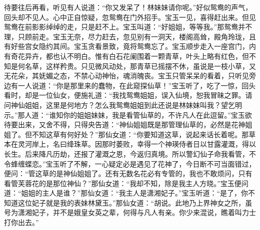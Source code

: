 \begin{parag}
    待要往后再看，听见有人说道：“你又发呆了！林妹妹请你呢。”好似鸳鸯的声气，回头却不见人。心中正自惊疑，忽鸳鸯在门外招手。宝玉一见，喜得赶出来。但见鸳鸯在前影影绰绰的走，只是赶不上。宝玉叫道：“好姐姐，等等我。”那鸳鸯并不理，只顾前走。宝玉无奈，尽力赶去，忽见别有一洞天，楼阁高耸，殿角玲珑，且有好些宫女隐约其间。宝玉贪看景致，竟将鸳鸯忘了。宝玉顺步走入一座宫门，内有奇花异卉，都也认不明白。惟有白石花阑围着一颗青草，叶头上略有红色，但不知是何名草，这样矜贵。只见微风动处，那青草已摇摆不休，虽说是一枝小草，又无花朵，其妩媚之态，不禁心动神怡，魂消魄丧。宝玉只管呆呆的看着，只听见旁边有一人说道：“你是那里来的蠢物，在此窥探仙草！”宝玉听了，吃了一惊，回头看时，却是一位仙女，便施礼道：“我找鸳鸯姐姐，误入仙境，恕我冒昧之罪。请问神仙姐姐，这里是何地方？怎么我鸳鸯姐姐到此还说是林妹妹叫我？望乞明示。”那人道：“谁知你的姐姐妹妹，我是看管仙草的，不许凡人在此逗留。”宝玉欲待要出来，又舍不得，只得央告道：“神仙姐姐既是那管理仙草的，必然是花神姐姐了。但不知这草有何好处？”那仙女道：“你要知道这草，说起来话长着呢。那草本在灵河岸上，名曰绛珠草。因那时萎败，幸得一个神瑛侍者日以甘露灌溉，得以长生。后来降凡历劫，还报了灌溉之恩，今返归真境。所以警幻仙子命我看管，不令蜂缠蝶恋。”宝玉听了不解，一心疑定必是遇见了花神了，今日断不可当面错过，便问：“管这草的是神仙姐姐了。还有无数名花必有专管的，我也不敢烦问，只有看管芙蓉花的是那位神仙？”那仙女道：“我却不知，除是我主人方晓。”宝玉便问道：“姐姐的主人是谁？”那仙女道：“我主人是潇湘妃子。”宝玉听道：“是了，你不知道这位妃子就是我的表妹林黛玉。”那仙女道：“胡说。此地乃上界神女之所，虽号为潇湘妃子，并不是娥皇女英之辈，何得与凡人有亲。你少来混说，瞧着叫力士打你出去。”
\end{parag}


